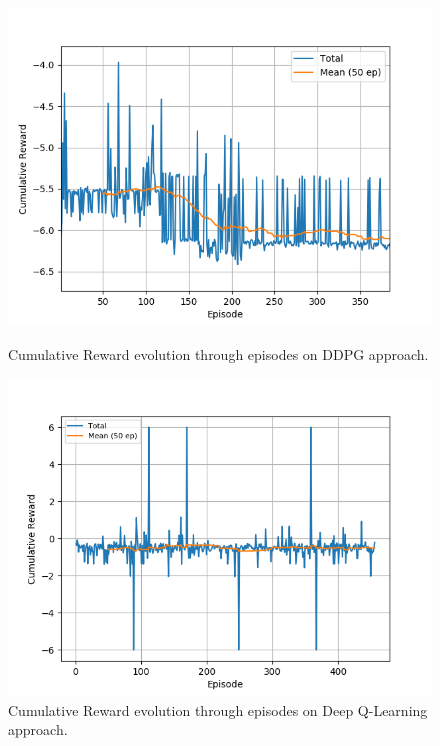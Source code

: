 \documentclass[peerreview,onecolumn]{IEEEtran}
\begin{document}
	  \begin{figure}[t]
\centering
\begin{minipage}{0.45\textwidth}
	\includegraphics[scale=0.55]{img/cumulative_reward.png}
	\caption{Cumulative Reward evolution through episodes on DDPG approach.}
	\label{fig:reward}

	\end{minipage}
	\hspace{0.2cm}
	\begin{minipage}{0.45\textwidth}
		\centering
		\includegraphics[scale=0.55]{img/rewardDQN.png}
		\caption{Cumulative Reward evolution through episodes on Deep Q-Learning approach.}
		\label{fig:reward_1}
		\centering
	\end{minipage}	
	\end{figure} 
	  
\end{document}
